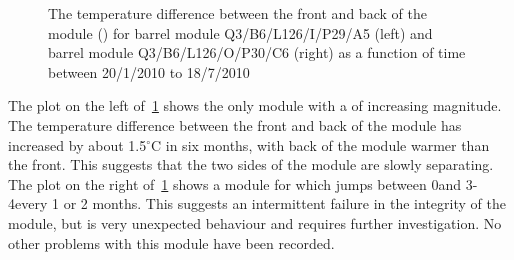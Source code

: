 \begin{figure}[h]
 	\centering
	\caption{The temperature difference between the front and back of the module (\deltat) for barrel module Q3/B6/L126/I/P29/A5 (left) and barrel module Q3/B6/L126/O/P30/C6 (right) as a function of time between 20/1/2010 to 18/7/2010}
	\label{fig:pm_ev_dt}
\end{figure}

The plot on the left of~\ref{fig:pm_ev_dt} shows the only module with a \deltat of increasing magnitude. The temperature difference between the front and back of the module has increased by about 1.5$^\circ$C in six months, with back of the module warmer than the front. This suggests that the two sides of the module are slowly separating. The plot on the right of~\ref{fig:pm_ev_dt} shows a  module for which \deltat jumps between 0\dc  and 3-4\dc every 1 or 2 months. This suggests an intermittent failure in the integrity of the module, but is very unexpected behaviour and requires further investigation. No other problems with this module have been recorded.

